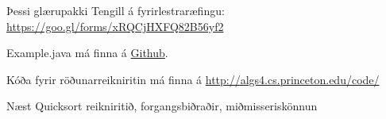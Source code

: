 \documentclass[handout]{beamer}
\begin{document}
\begin{frame}{Þessi glærupakki}
Tengill á fyrirlestraræfingu: \url{https://goo.gl/forms/xRQCjHXFQ82B56yf2}
\vspace{1cm}

Example.java má finna á \href{https://github.com/Ernir/kennsluefni/tree/master/T2/Code/w6}{Github}. 

Kóða fyrir röðunarreikniritin má finna á \url{http://algs4.cs.princeton.edu/code/}
\end{frame}

\begin{frame}{Næst}
Quicksort reikniritið, forgangsbiðraðir, miðmisseriskönnun
\end{frame}
\end{document}
